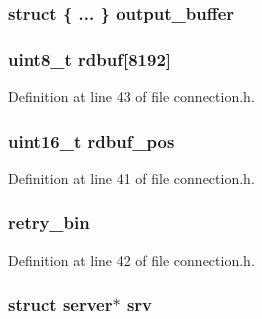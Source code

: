 \subsubsection[{\texorpdfstring{output\+\_\+buffer}{output_buffer}}]{\setlength{\rightskip}{0pt plus 5cm}struct \{ ... \}   output\+\_\+buffer}\hypertarget{structconnection_a48fdd11f6626fbc7383519e83d1e1851}{}\label{structconnection_a48fdd11f6626fbc7383519e83d1e1851}
\subsubsection[{\texorpdfstring{rdbuf}{rdbuf}}]{\setlength{\rightskip}{0pt plus 5cm}uint8\+\_\+t rdbuf\mbox{[}8192\mbox{]}}\hypertarget{structconnection_a5ef1bf0cfdcd46839f0cfa90ca3c76df}{}\label{structconnection_a5ef1bf0cfdcd46839f0cfa90ca3c76df}


Definition at line 43 of file connection.\+h.

\subsubsection[{\texorpdfstring{rdbuf\+\_\+pos}{rdbuf_pos}}]{\setlength{\rightskip}{0pt plus 5cm}uint16\+\_\+t rdbuf\+\_\+pos}\hypertarget{structconnection_a29724ccd4546e85e7f3a729236694fc6}{}\label{structconnection_a29724ccd4546e85e7f3a729236694fc6}


Definition at line 41 of file connection.\+h.

\subsubsection[{\texorpdfstring{retry\+\_\+bin}{retry_bin}}]{ retry\+\_\+bin}\hypertarget{structconnection_a589462cfe27c04b6a09ff7ef2d8cf35d}{}\label{structconnection_a589462cfe27c04b6a09ff7ef2d8cf35d}


Definition at line 42 of file connection.\+h.

\subsubsection[{\texorpdfstring{srv}{srv}}]{\setlength{\rightskip}{0pt plus 5cm}struct {\bf server}$\ast$ srv}\hypertarget{structconnection_a1b6916fd6bd625513f86cc35333623c9}{}\label{structconnection_a1b6916fd6bd625513f86cc35333623c9}


